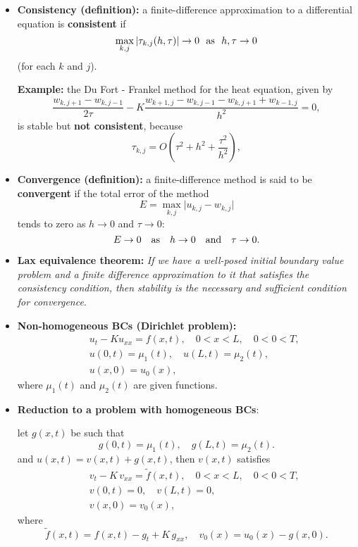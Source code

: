 \documentclass[12pt]{article}
\begin{document}
\begin{itemize}
\item {\bf Consistency (definition):} a finite-difference approximation to a differential equation
is {\bf consistent} if
\[
\max_{k,j}\vert \tau_{k,j}(h,\tau)\vert \to 0 \ \ {\rm as} \ \ h,\tau \to 0
\]
(for each $k$ and $j$).


{\bf Example:} the Du Fort - Frankel method for the heat equation,
given by
\[
\frac{w_{k,j+1}-w_{k,j-1}}{2\tau}- K\frac{w_{k+1,
j}-w_{k,j-1}-w_{k,j+1}+w_{k-1,j}}{h^{2}}=0,
\]
is stable but \textbf{not consistent}, because
\[
\tau_{k,j}=O\left(\tau^2+h^2+\frac{\tau^2}{h^2}\right),
\]

\item \textbf{Convergence (definition):} a finite-difference method is said to be {\bf convergent}
if the total error of the method
\[
E=\max\limits_{k,j}\vert u_{k,j}-w_{k,j}\vert
\]
tends to zero as $h\to 0$ and $\tau\to 0$:
\[
E \to 0 \quad {\rm as} \quad h\to 0 \quad {\rm and} \quad \tau\to 0.
\]


\item {\bf Lax equivalence theorem:}
{\it If we have a well-posed initial boundary value problem and a finite
difference approximation to it that satisfies the consistency condition, then
stability is the necessary and sufficient condition for convergence}.


\item \textbf{Non-homogeneous BCs (Dirichlet problem):}
\begin{eqnarray}
&&u_{t} - K u_{xx} = f(x,t), \quad
0<x< L, \quad 0<0<T,   \nonumber \\
&&u(0,t)=\mu_{1}(t), \quad u(L,t)=\mu_{2}(t), \nonumber \\
&&u(x, 0) = u_{0}(x),   \nonumber
\end{eqnarray}
where $\mu_{1}(t)$ and $\mu_{2}(t)$ are given functions.

\item \textbf{Reduction to a problem
with homogeneous BCs}:

let $g(x,t)$ be such that
\[
g(0,t)=\mu_{1}(t), \quad g(L,t)=\mu_{2}(t).
\]
and $u(x,t)=v(x,t)+g(x,t)$, then $v(x,t)$ satisfies
\begin{eqnarray}
&&v_{t} - K \, v_{xx} = \tilde{f}(x,t), \quad
0<x< L, \quad 0<0<T,   \nonumber \\
&&v(0,t)=0, \quad v(L,t)=0, \nonumber \\
&&v(x, 0) = v_{0}(x),   \nonumber
\end{eqnarray}
where
\[
\tilde{f}(x,t)=f(x,t)-
g_{t} + K \, g_{xx}, \quad
v_{0}(x)=u_{0}(x)-g(x,0).
\]



\end{itemize}
\end{document}

